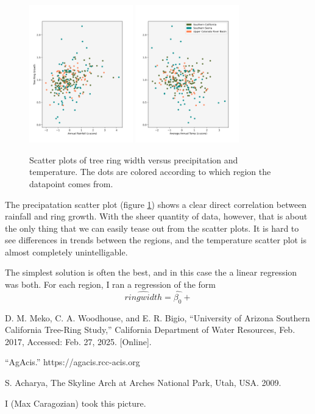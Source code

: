 \documentclass[]{article}
\begin{document}
\begin{figure}
	\centering
	\includegraphics[width=0.4\textwidth]{precip_scatter.png}
	\includegraphics[width=0.4\textwidth]{temp_scatter.png}
	\caption{Scatter plots of tree ring width versus precipitation and temperature. The dots are colored according to which region the datapoint comes from. }
	\label{fig:weather_scatter}
\end{figure} 

The precipatation scatter plot (figure \ref{fig:weather_scatter}) shows a clear direct correlation between rainfall and ring growth. With the sheer quantity of data, however, that is about the only thing that we can easily tease out from the scatter plots. It is hard to see differences in trends between the regions, and the temperature scatter plot is almost completely unintelligable.

The simplest solution is often the  best, and in this case the a linear regression was both. For each region, I ran a regression of the form
$$
\widehat{ringwidth} = \hat{\beta_0} + 
$$







\begin{thebibliography}{9}
	D. M. Meko, C. A. Woodhouse, and E. R. Bigio, “University of Arizona
	Southern California Tree-Ring Study,” California Department of Water Resources, Feb. 2017, Accessed: Feb. 27, 2025. [Online].
	
	“AgAcis.” https://agacis.rcc-acis.org
	
	S. Acharya, The Skyline Arch at Arches National Park, Utah, USA. 2009.
	
	I (Max Caragozian) took this picture.
\end{thebibliography}
\end{document}
